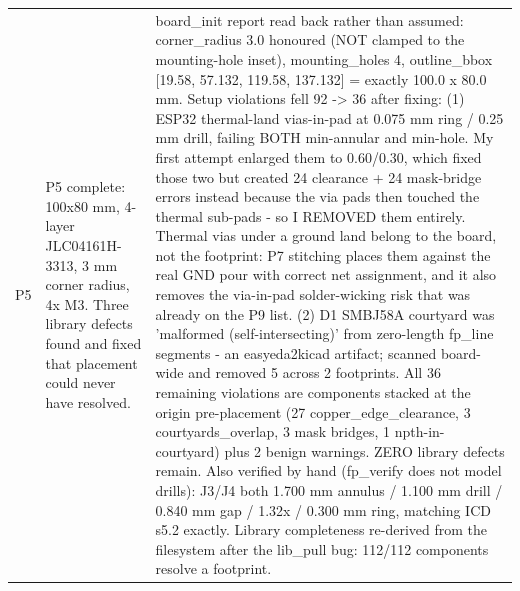 \documentclass[11pt,a4paper]{article}
\begin{document}
{\begin{longtable}{lp{5.2cm}p{7.2cm}}
P5 & P5 complete: 100x80 mm, 4-layer JLC04161H-3313, 3 mm corner radius, 4x M3. Three library defects found and fixed that placement could never have resolved. & board\_init report read back rather than assumed: corner\_radius 3.0 honoured (NOT clamped to the mounting-hole inset), mounting\_holes 4, outline\_bbox {[}19.58, 57.132, 119.58, 137.132{]} = exactly 100.0 x 80.0 mm. Setup violations fell 92 -\textgreater{} 36 after fixing: (1) ESP32 thermal-land vias-in-pad at 0.075 mm ring / 0.25 mm drill, failing BOTH min-annular and min-hole. My first attempt enlarged them to 0.60/0.30, which fixed those two but created 24 clearance + 24 mask-bridge errors instead because the via pads then touched the thermal sub-pads - so I REMOVED them entirely. Thermal vias under a ground land belong to the board, not the footprint: P7 stitching places them against the real GND pour with correct net assignment, and it also removes the via-in-pad solder-wicking risk that was already on the P9 list. (2) D1 SMBJ58A courtyard was 'malformed (self-intersecting)' from zero-length fp\_line segments - an easyeda2kicad artifact; scanned board-wide and removed 5 across 2 footprints. All 36 remaining violations are components stacked at the origin pre-placement (27 copper\_edge\_clearance, 3 courtyards\_overlap, 3 mask bridges, 1 npth-in-courtyard) plus 2 benign warnings. ZERO library defects remain. Also verified by hand (fp\_verify does not model drills): J3/J4 both 1.700 mm annulus / 1.100 mm drill / 0.840 mm gap / 1.32x / 0.300 mm ring, matching ICD s5.2 exactly. Library completeness re-derived from the filesystem after the lib\_pull bug: 112/112 components resolve a footprint. \\

\end{longtable}}
\end{document}
